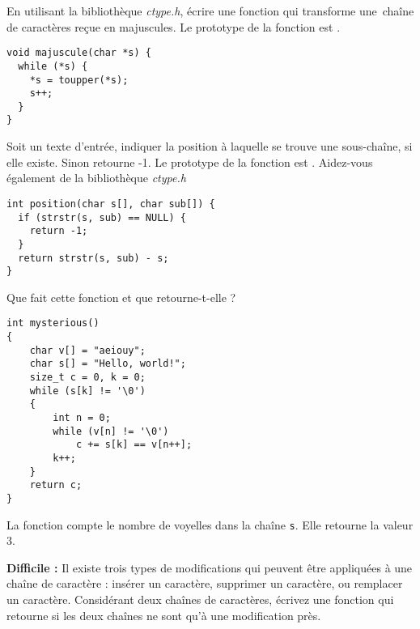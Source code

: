 \documentclass[french,a4paper,addpoints,11pt]{exam}
\begin{document}
\begin{questions}

\question En utilisant la bibliothèque \emph{ctype.h}, écrire une fonction qui transforme une\ chaîne de caractères reçue en majuscules. Le prototype de la fonction est .

\ifprintanswers

\begin{lstlisting}
void majuscule(char *s) {
  while (*s) {
    *s = toupper(*s);
    s++;
  }
}
\end{lstlisting}
\fi

\question Soit un texte d'entrée, indiquer la position à laquelle se trouve une sous-chaîne, si elle existe. Sinon retourne -1. Le prototype de la fonction est . Aidez-vous également de la bibliothèque \emph{ctype.h}

\ifprintanswers

\begin{lstlisting}
int position(char s[], char sub[]) {
  if (strstr(s, sub) == NULL) {
    return -1;
  }
  return strstr(s, sub) - s;
}
\end{lstlisting}
\fi

\question Que fait cette fonction et que retourne-t-elle ?

\begin{lstlisting}
int mysterious()
{
    char v[] = "aeiouy";
    char s[] = "Hello, world!";
    size_t c = 0, k = 0;
    while (s[k] != '\0')
    {
        int n = 0;
        while (v[n] != '\0')
            c += s[k] == v[n++];
        k++;
    }
    return c;
}
\end{lstlisting}

\ifprintanswers
\begin{solution}
La fonction compte le nombre de voyelles dans la chaîne \texttt{s}. Elle retourne la valeur 3.
\end{solution}
\else
\fillwithdottedlines{1cm}
\fi
  
\question 
\textbf{Difficile : } Il existe trois types de modifications qui peuvent être appliquées à une chaîne de caractère : insérer un caractère, supprimer un caractère, ou remplacer un caractère. Considérant deux chaînes de caractères, écrivez une fonction qui retourne si les deux chaînes ne sont qu'à une modification pr\`es.


\end{questions}
\end{document}
